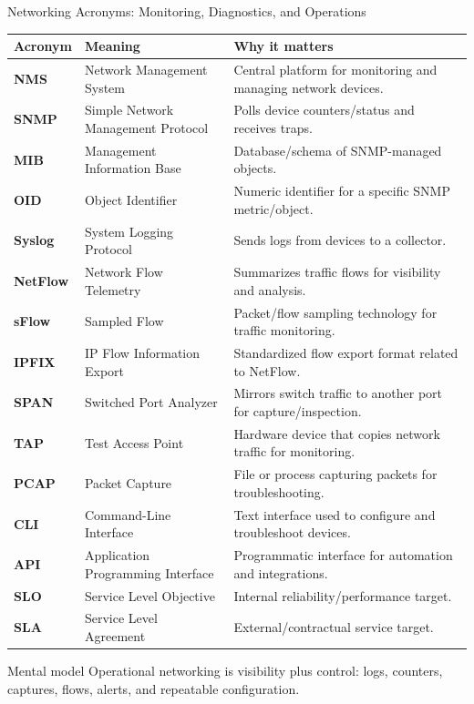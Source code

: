 \documentclass[aspectratio=169]{beamer}
\begin{document}
\begin{frame}{Networking Acronyms: Monitoring, Diagnostics, and Operations}
\tiny

\begin{tabular}{p{1.8cm} p{3.7cm} p{6.7cm}}
\toprule
\textbf{Acronym} & \textbf{Meaning} & \textbf{Why it matters} \\
\midrule
\textbf{NMS} & Network Management System & Central platform for monitoring and managing network devices. \\
\textbf{SNMP} & Simple Network Management Protocol & Polls device counters/status and receives traps. \\
\textbf{MIB} & Management Information Base & Database/schema of SNMP-managed objects. \\
\textbf{OID} & Object Identifier & Numeric identifier for a specific SNMP metric/object. \\
\textbf{Syslog} & System Logging Protocol & Sends logs from devices to a collector. \\
\textbf{NetFlow} & Network Flow Telemetry & Summarizes traffic flows for visibility and analysis. \\
\textbf{sFlow} & Sampled Flow & Packet/flow sampling technology for traffic monitoring. \\
\textbf{IPFIX} & IP Flow Information Export & Standardized flow export format related to NetFlow. \\
\textbf{SPAN} & Switched Port Analyzer & Mirrors switch traffic to another port for capture/inspection. \\
\textbf{TAP} & Test Access Point & Hardware device that copies network traffic for monitoring. \\
\textbf{PCAP} & Packet Capture & File or process capturing packets for troubleshooting. \\
\textbf{CLI} & Command-Line Interface & Text interface used to configure and troubleshoot devices. \\
\textbf{API} & Application Programming Interface & Programmatic interface for automation and integrations. \\
\textbf{SLO} & Service Level Objective & Internal reliability/performance target. \\
\textbf{SLA} & Service Level Agreement & External/contractual service target. \\
\bottomrule
\end{tabular}

\vspace{0.12cm}

\begin{block}{Mental model}
Operational networking is visibility plus control: logs, counters, captures, flows, alerts, and repeatable configuration.
\end{block}

\end{frame}
\end{document}
